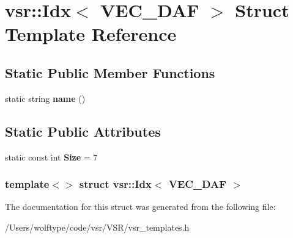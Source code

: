 \hypertarget{structvsr_1_1_idx_3_01_v_e_c___d_a_f_01_4}{\section{vsr\-:\-:Idx$<$ V\-E\-C\-\_\-\-D\-A\-F $>$ Struct Template Reference}
\label{structvsr_1_1_idx_3_01_v_e_c___d_a_f_01_4}
}
\subsection*{Static Public Member Functions}
\begin{DoxyCompactItemize}
\item 
\hypertarget{structvsr_1_1_idx_3_01_v_e_c___d_a_f_01_4_a676372528813600152449ac4018697b1}{static string {\bfseries name} ()}\label{structvsr_1_1_idx_3_01_v_e_c___d_a_f_01_4_a676372528813600152449ac4018697b1}

\end{DoxyCompactItemize}
\subsection*{Static Public Attributes}
\begin{DoxyCompactItemize}
\item 
\hypertarget{structvsr_1_1_idx_3_01_v_e_c___d_a_f_01_4_a99dddf1e738459abd91ac3bf894b1c41}{static const int {\bfseries Size} = 7}\label{structvsr_1_1_idx_3_01_v_e_c___d_a_f_01_4_a99dddf1e738459abd91ac3bf894b1c41}

\end{DoxyCompactItemize}
\subsubsection*{template$<$$>$ struct vsr\-::\-Idx$<$ V\-E\-C\-\_\-\-D\-A\-F $>$}



The documentation for this struct was generated from the following file\-:\begin{DoxyCompactItemize}
\item 
/\-Users/wolftype/code/vsr/\-V\-S\-R/vsr\-\_\-templates.\-h\end{DoxyCompactItemize}
